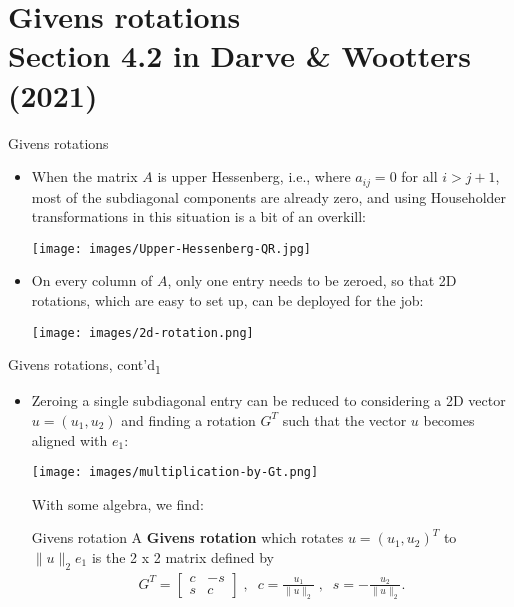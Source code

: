 \documentclass[t,usepdftitle=false]{beamer}
\begin{document}
\section{Givens rotations\\{\small Section 4.2 in Darve \& Wootters (2021)}}

\begin{frame}{Givens rotations}
\begin{itemize}
\item When the matrix $A$ is upper Hessenberg, i.e., where $a_{ij}=0$ for all $i>j+1$, most of the subdiagonal components are already zero, and using Householder transformations in this situation is a bit of an overkill:
\begin{center}
\vspace{.2cm}
\texttt{[image: images/Upper-Hessenberg-QR.jpg]}
\end{center}
\item On every column of $A$, only one entry needs to be zeroed, so that 2D rotations, which are easy to set up, can be deployed for the job:
\begin{center}
\vspace{.2cm}
\texttt{[image: images/2d-rotation.png]}
\end{center}
\end{itemize}
\end{frame}

\begin{frame}{Givens rotations, cont'd\textsubscript{1}}
\begin{itemize}
\item Zeroing a single subdiagonal entry can be reduced to considering a 2D vector $u=(u_1,u_2)$ and finding a rotation $G^T$ such that the vector $u$ becomes aligned with $e_1$:
\begin{center}
\vspace{.2cm}
\texttt{[image: images/multiplication-by-Gt.png]}
\end{center}
With some algebra, we find:\vspace{-.1cm}
\begin{block}{Givens rotation}
A \textbf{Givens rotation} which rotates $u=(u_1,u_2)^T$ to $\|u\|_2e_1$ is the 2 x 2 matrix defined by\vspace{-.75cm}
\begin{align*}
G^T=\begin{bmatrix}
c&-s\\s&c
\end{bmatrix}
\;,\;\;
c=\frac{u_1}{\|u\|_2}
\;,\;\;
s=-\frac{u_2 }{\|u\|_2}.
\end{align*} 
\end{block}
\end{itemize}
\end{frame}
\end{document}
